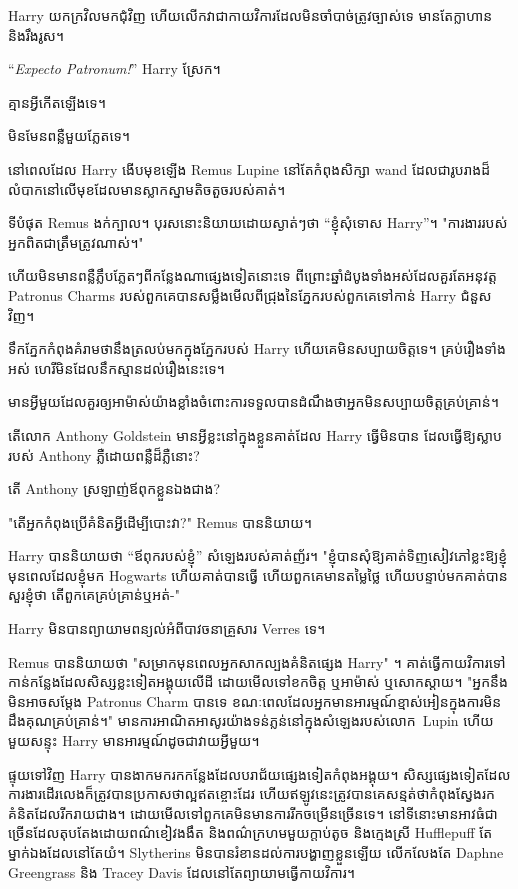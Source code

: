 Harry យក​ក្រវិល​មក​ជុំវិញ ហើយ​លើក​វា​ជា​កាយវិការ​ដែល​មិន​ចាំ​បាច់​ត្រូវ​ច្បាស់​ទេ មាន​តែ​ក្លាហាន និង​រឹងរូស។

“\emph{Expecto Patronum!}” Harry ស្រែក។

គ្មានអ្វីកើតឡើងទេ។

មិនមែនពន្លឺមួយភ្លែតទេ។

នៅពេលដែល Harry ងើបមុខឡើង Remus Lupine នៅតែកំពុងសិក្សា wand ដែលជារូបរាងដ៏លំបាកនៅលើមុខដែលមានស្លាកស្នាមតិចតួចរបស់គាត់។

ទីបំផុត Remus ងក់ក្បាល។ បុរស​នោះ​និយាយ​ដោយ​ស្ងាត់ៗ​ថា “ខ្ញុំ​សុំទោស Harry”។ "ការងាររបស់អ្នកពិតជាត្រឹមត្រូវណាស់។"

ហើយមិនមានពន្លឺភ្លឹបភ្លែតៗពីកន្លែងណាផ្សេងទៀតនោះទេ ពីព្រោះឆ្នាំដំបូងទាំងអស់ដែលគួរតែអនុវត្ត Patronus Charms របស់ពួកគេបានសម្លឹងមើលពីជ្រុងនៃភ្នែករបស់ពួកគេទៅកាន់ Harry ជំនួសវិញ។

ទឹកភ្នែក​កំពុង​គំរាម​ថា​នឹង​ត្រលប់​មក​ក្នុង​ភ្នែក​របស់ Harry ហើយ​គេ​មិន​សប្បាយចិត្ត​ទេ។ គ្រប់រឿងទាំងអស់ ហេរីមិនដែលនឹកស្មានដល់រឿងនេះទេ។

មាន​អ្វី​មួយ​ដែល​គួរ​ឲ្យ​អាម៉ាស់​យ៉ាង​ខ្លាំង​ចំពោះ​ការ​ទទួល​បាន​ដំណឹង​ថា​អ្នក​មិន​សប្បាយ​ចិត្ត​គ្រប់គ្រាន់។

តើលោក Anthony Goldstein មានអ្វីខ្លះនៅក្នុងខ្លួនគាត់ដែល Harry ធ្វើមិនបាន ដែលធ្វើឱ្យស្លាបរបស់ Anthony ភ្លឺដោយពន្លឺដ៏ភ្លឺនោះ?

តើ Anthony ស្រឡាញ់​ឪពុក​ខ្លួនឯង​ជាង​?

"តើអ្នកកំពុងប្រើគំនិតអ្វីដើម្បីបោះវា?" Remus បាននិយាយ។

Harry បាននិយាយថា “ឪពុករបស់ខ្ញុំ” សំឡេងរបស់គាត់ញ័រ។ "ខ្ញុំបានសុំឱ្យគាត់ទិញសៀវភៅខ្លះឱ្យខ្ញុំ មុនពេលដែលខ្ញុំមក Hogwarts ហើយគាត់បានធ្វើ ហើយពួកគេមានតម្លៃថ្លៃ ហើយបន្ទាប់មកគាត់បានសួរខ្ញុំថា តើពួកគេគ្រប់គ្រាន់ឬអត់-"

Harry មិនបានព្យាយាមពន្យល់អំពីបាវចនាគ្រួសារ Verres ទេ។

Remus បាននិយាយថា "សម្រាកមុនពេលអ្នកសាកល្បងគំនិតផ្សេង Harry" ។ គាត់​ធ្វើ​កាយវិការ​ទៅ​កាន់​កន្លែង​ដែល​សិស្ស​ខ្លះ​ទៀត​អង្គុយ​លើ​ដី ដោយ​មើល​ទៅ​ខក​ចិត្ត ឬ​អាម៉ាស់ ឬ​សោកស្ដាយ។ "អ្នកនឹងមិនអាចសម្ដែង Patronus Charm បានទេ ខណៈពេលដែលអ្នកមានអារម្មណ៍ខ្មាស់អៀនក្នុងការមិនដឹងគុណគ្រប់គ្រាន់។" មានការអាណិតអាសូរយ៉ាងទន់ភ្លន់នៅក្នុងសំឡេងរបស់លោក~Lupin ហើយមួយសន្ទុះ Harry មានអារម្មណ៍ដូចជាវាយអ្វីមួយ។

ផ្ទុយទៅវិញ Harry បានងាកមករកកន្លែងដែលបរាជ័យផ្សេងទៀតកំពុងអង្គុយ។ សិស្សផ្សេងទៀតដែលការងារដើរលេងក៏ត្រូវបានប្រកាសថាល្អឥតខ្ចោះដែរ ហើយឥឡូវនេះត្រូវបានគេសន្មត់ថាកំពុងស្វែងរកគំនិតដែលរីករាយជាង។ ដោយ​មើល​ទៅ​ពួក​គេ​មិន​មាន​ការ​រីក​ចម្រើន​ច្រើន​ទេ។ នៅទីនោះមានអាវធំជាច្រើនដែលតុបតែងដោយពណ៌ខៀវងងឹត និងពណ៌ក្រហមមួយក្តាប់តូច និងក្មេងស្រី Hufflepuff តែម្នាក់ឯងដែលនៅតែយំ។ Slytherins មិន​បាន​រំខាន​ដល់​ការ​បង្ហាញ​ខ្លួន​ឡើយ លើក​លែង​តែ Daphne Greengrass និង Tracey Davis ដែល​នៅ​តែ​ព្យាយាម​ធ្វើ​កាយវិការ។

